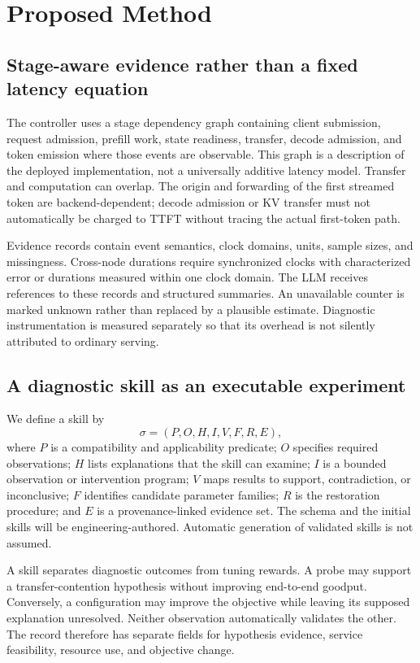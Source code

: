 \documentclass[11pt,a4paper]{article}
\begin{document}
\section{Proposed Method}
\subsection{Stage-aware evidence rather than a fixed latency equation}
The controller uses a stage dependency graph containing client submission, request admission, prefill work, state readiness, transfer, decode admission, and token emission where those events are observable. This graph is a description of the deployed implementation, not a universally additive latency model. Transfer and computation can overlap. The origin and forwarding of the first streamed token are backend-dependent; decode admission or KV transfer must not automatically be charged to TTFT without tracing the actual first-token path.

Evidence records contain event semantics, clock domains, units, sample sizes, and missingness. Cross-node durations require synchronized clocks with characterized error or durations measured within one clock domain. The LLM receives references to these records and structured summaries. An unavailable counter is marked unknown rather than replaced by a plausible estimate. Diagnostic instrumentation is measured separately so that its overhead is not silently attributed to ordinary serving.

\subsection{A diagnostic skill as an executable experiment}
We define a skill by
\begin{equation}
 \sigma=(P,O,H,I,V,F,R,E),
\end{equation}
where $P$ is a compatibility and applicability predicate; $O$ specifies required observations; $H$ lists explanations that the skill can examine; $I$ is a bounded observation or intervention program; $V$ maps results to support, contradiction, or inconclusive; $F$ identifies candidate parameter families; $R$ is the restoration procedure; and $E$ is a provenance-linked evidence set. The schema and the initial skills will be engineering-authored. Automatic generation of validated skills is not assumed.

A skill separates diagnostic outcomes from tuning rewards. A probe may support a transfer-contention hypothesis without improving end-to-end goodput. Conversely, a configuration may improve the objective while leaving its supposed explanation unresolved. Neither observation automatically validates the other. The record therefore has separate fields for hypothesis evidence, service feasibility, resource use, and objective change.
\end{document}

